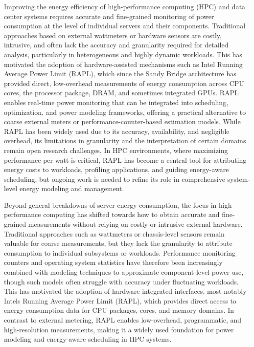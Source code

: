 Improving the energy efficiency of high-performance computing (HPC) and data center systems requires accurate and fine-grained monitoring of power consumption at the level of individual servers and their components. Traditional approaches based on external wattmeters or hardware sensors are costly, intrusive, and often lack the accuracy and granularity required for detailed analysis, particularly in heterogeneous and highly dynamic workloads. This has motivated the adoption of hardware-assisted mechanisms such as Intel Running Average Power Limit (RAPL), which since the Sandy Bridge architecture has provided direct, low-overhead measurements of energy consumption across CPU cores, the processor package, DRAM, and sometimes integrated GPUs. RAPL enables real-time power monitoring that can be integrated into scheduling, optimization, and power modeling frameworks, offering a practical alternative to coarse external meters or performance-counter-based estimation models. While RAPL has been widely used due to its accuracy, availability, and negligible overhead, its limitations in granularity and the interpretation of certain domains remain open research challenges. In HPC environments, where maximizing performance per watt is critical, RAPL has become a central tool for attributing energy costs to workloads, profiling applications, and guiding energy-aware scheduling, but ongoing work is needed to refine its role in comprehensive system-level energy modeling and management.

Beyond general breakdowns of server energy consumption, the focus in high-performance computing has shifted towards how to obtain accurate and fine-grained measurements without relying on costly or intrusive external hardware. Traditional approaches such as wattmeters or chassis-level sensors remain valuable for coarse measurements, but they lack the granularity to attribute consumption to individual subsystems or workloads. Performance monitoring counters and operating system statistics have therefore been increasingly combined with modeling techniques to approximate component-level power use, though such models often struggle with accuracy under fluctuating workloads. This has motivated the adoption of hardware-integrated interfaces, most notably Intels Running Average Power Limit (RAPL), which provides direct access to energy consumption data for CPU packages, cores, and memory domains. In contrast to external metering, RAPL enables low-overhead, programmatic, and high-resolution measurements, making it a widely used foundation for power modeling and energy-aware scheduling in HPC systems.

